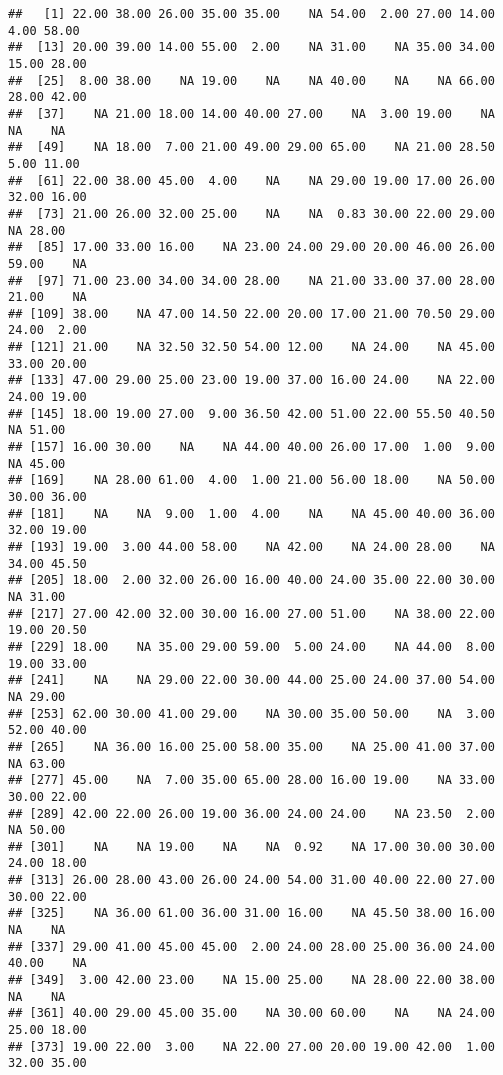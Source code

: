 \documentclass[
]{article}
\begin{document}
\begin{verbatim}
##   [1] 22.00 38.00 26.00 35.00 35.00    NA 54.00  2.00 27.00 14.00  4.00 58.00
##  [13] 20.00 39.00 14.00 55.00  2.00    NA 31.00    NA 35.00 34.00 15.00 28.00
##  [25]  8.00 38.00    NA 19.00    NA    NA 40.00    NA    NA 66.00 28.00 42.00
##  [37]    NA 21.00 18.00 14.00 40.00 27.00    NA  3.00 19.00    NA    NA    NA
##  [49]    NA 18.00  7.00 21.00 49.00 29.00 65.00    NA 21.00 28.50  5.00 11.00
##  [61] 22.00 38.00 45.00  4.00    NA    NA 29.00 19.00 17.00 26.00 32.00 16.00
##  [73] 21.00 26.00 32.00 25.00    NA    NA  0.83 30.00 22.00 29.00    NA 28.00
##  [85] 17.00 33.00 16.00    NA 23.00 24.00 29.00 20.00 46.00 26.00 59.00    NA
##  [97] 71.00 23.00 34.00 34.00 28.00    NA 21.00 33.00 37.00 28.00 21.00    NA
## [109] 38.00    NA 47.00 14.50 22.00 20.00 17.00 21.00 70.50 29.00 24.00  2.00
## [121] 21.00    NA 32.50 32.50 54.00 12.00    NA 24.00    NA 45.00 33.00 20.00
## [133] 47.00 29.00 25.00 23.00 19.00 37.00 16.00 24.00    NA 22.00 24.00 19.00
## [145] 18.00 19.00 27.00  9.00 36.50 42.00 51.00 22.00 55.50 40.50    NA 51.00
## [157] 16.00 30.00    NA    NA 44.00 40.00 26.00 17.00  1.00  9.00    NA 45.00
## [169]    NA 28.00 61.00  4.00  1.00 21.00 56.00 18.00    NA 50.00 30.00 36.00
## [181]    NA    NA  9.00  1.00  4.00    NA    NA 45.00 40.00 36.00 32.00 19.00
## [193] 19.00  3.00 44.00 58.00    NA 42.00    NA 24.00 28.00    NA 34.00 45.50
## [205] 18.00  2.00 32.00 26.00 16.00 40.00 24.00 35.00 22.00 30.00    NA 31.00
## [217] 27.00 42.00 32.00 30.00 16.00 27.00 51.00    NA 38.00 22.00 19.00 20.50
## [229] 18.00    NA 35.00 29.00 59.00  5.00 24.00    NA 44.00  8.00 19.00 33.00
## [241]    NA    NA 29.00 22.00 30.00 44.00 25.00 24.00 37.00 54.00    NA 29.00
## [253] 62.00 30.00 41.00 29.00    NA 30.00 35.00 50.00    NA  3.00 52.00 40.00
## [265]    NA 36.00 16.00 25.00 58.00 35.00    NA 25.00 41.00 37.00    NA 63.00
## [277] 45.00    NA  7.00 35.00 65.00 28.00 16.00 19.00    NA 33.00 30.00 22.00
## [289] 42.00 22.00 26.00 19.00 36.00 24.00 24.00    NA 23.50  2.00    NA 50.00
## [301]    NA    NA 19.00    NA    NA  0.92    NA 17.00 30.00 30.00 24.00 18.00
## [313] 26.00 28.00 43.00 26.00 24.00 54.00 31.00 40.00 22.00 27.00 30.00 22.00
## [325]    NA 36.00 61.00 36.00 31.00 16.00    NA 45.50 38.00 16.00    NA    NA
## [337] 29.00 41.00 45.00 45.00  2.00 24.00 28.00 25.00 36.00 24.00 40.00    NA
## [349]  3.00 42.00 23.00    NA 15.00 25.00    NA 28.00 22.00 38.00    NA    NA
## [361] 40.00 29.00 45.00 35.00    NA 30.00 60.00    NA    NA 24.00 25.00 18.00
## [373] 19.00 22.00  3.00    NA 22.00 27.00 20.00 19.00 42.00  1.00 32.00 35.00

\end{verbatim}
\end{document}
